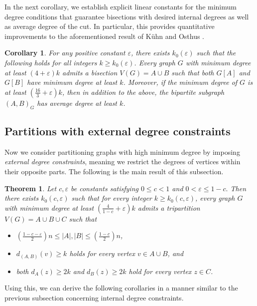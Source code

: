 \documentclass{aic}
\newtheorem{theorem}[dfn]{Theorem}
\newtheorem{corollary}[dfn]{Corollary}
\begin{document}
	In the next corollary, we establish explicit linear constants for the minimum degree conditions that guarantee bisections with desired internal degrees as well as average degree of the cut.
	In particular, this provides quantitative improvements to the aforementioned result of K\"uhn and Osthus \cite{KO}.
	
	\begin{corollary}\label{coro:int-bisec}
		For any positive constant $\varepsilon$, there exists $k_0(\varepsilon)$ such that the following holds for all integers $k \ge k_0(\varepsilon)$.
		Every graph $G$ with minimum degree at least $(4 + \varepsilon)k$ admits a bisection $V(G) = A \cup B$ such that
		both $G[A]$ and $G[B]$ have minimum degree at least $k$.
		Moreover, if the minimum degree of $G$ is at least $\left(\frac{16}{3} + \varepsilon\right)k$, then in addition to the above, the bipartite subgraph $(A, B)_G$ has average degree at least $k$.
	\end{corollary}
	
	\subsection{Partitions with external degree constraints}\label{subsec:intro-ext}
	\noindent
	Now we consider partitioning graphs with high minimum degree by imposing {\it external degree constraints},
	meaning we restrict the degrees of vertices within their opposite parts.
	The following is the main result of this subsection.
	
	\begin{theorem}\label{Thm:ext-bisec-exact}
		Let $c, \varepsilon$ be constants satisfying $0\leq c<1$ and $0<\varepsilon\leq 1-c.$
		Then there exists $k_0(c, \varepsilon)$ such that for every integer $k\geq k_0(c, \varepsilon)$,
		every graph $G$ with minimum degree at least $\left(\frac{4}{1-c}+\varepsilon\right)k$ admits a tripartition $V(G)=A\cup B\cup C$ such that
		\begin{itemize}
			\item[(1).] $\left(\frac{1-c-\varepsilon}{2}\right)n\leq |A|,|B|\leq \left(\frac{1-c}{2}\right)n$,
			\item[(2).] $d_{(A,B)}(v)\geq k$ holds for every vertex $v\in A\cup B$, and
			\item[(3).] both $d_A(z)\geq 2k$ and $d_B(z)\geq 2k$ hold for every vertex $z\in C$.
		\end{itemize}
	\end{theorem}
	
	Using this, we can derive the following corollaries in a manner similar to the previous subsection concerning internal degree constraints.
	
\end{document}
